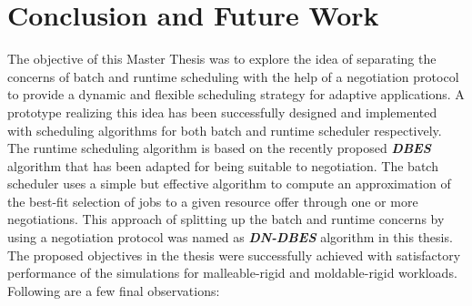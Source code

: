 \chapter{Conclusion and Future Work}\label{chapter:conclusion and future}
The objective of this Master Thesis was to explore the idea of separating the concerns of batch and runtime scheduling with the help of a negotiation protocol to provide a dynamic and flexible scheduling strategy for adaptive applications. A prototype realizing this idea has been successfully designed and implemented with scheduling algorithms for both batch and runtime scheduler respectively. The runtime scheduling algorithm is based on the recently proposed \textbf{\textit{DBES}} algorithm that has been adapted for being suitable to negotiation. The batch scheduler uses a simple but effective algorithm to compute an approximation of the best-fit selection of jobs to a given resource offer through one or more negotiations. This approach of splitting up the batch and runtime concerns by using a negotiation protocol was named as \textbf{\textit{DN-DBES}} algorithm in this thesis. The proposed objectives in the thesis were successfully achieved with satisfactory performance of the simulations for malleable-rigid and moldable-rigid workloads. Following are a few final observations:
